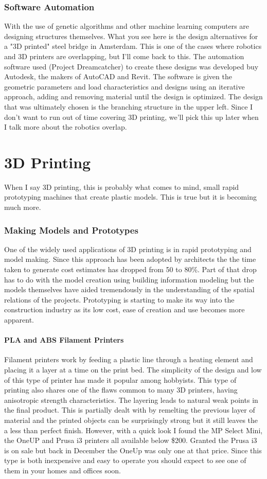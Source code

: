 \documentclass[11pt]{article}
\begin{document}
\subsubsection{Software Automation}
With the use of genetic algorithms and other machine learning computers are designing structures themselves.  What you see here is the design alternatives for a "3D printed" steel bridge in Amsterdam.  This is one of the cases where robotics and 3D printers are overlapping, but I'll come back to this.  The automation software used (Project Dreamcatcher) to create these designs was developed buy Autodesk, the makers of AutoCAD and Revit.  The software is given the geometric parameters and load characteristics and designs using an iterative approach, adding and removing material until the design is optimized.  The design that was ultimately chosen is the branching structure in the upper left.  Since I don't want to run out of time covering 3D printing, we'll pick this up later when I talk more about the robotics overlap.
\section{3D Printing}
When I say 3D printing, this is probably what comes to mind, small rapid prototyping machines that create plastic models. This is true but it is becoming much more.
\subsubsection{Making Models and Prototypes}
One of the widely used applications of 3D printing is in rapid prototyping and model making.  Since this approach has been adopted by architects the the time taken to generate cost estimates has dropped from 50 to 80\%.  Part of that drop has to do with the model creation using building information modeling but the models themselves have aided tremendously in the understanding of the spatial relations of the projects.  Prototyping is starting to make its way into the construction industry as its low cost, ease of creation and use becomes more apparent.
\paragraph{PLA and ABS Filament Printers}


Filament printers work by feeding a plastic line through a heating element and placing it a layer at a time on the print bed.  The simplicity of the design and low of this type of printer has made it popular among hobbyists.  This type of printing also shares one of the flaws common to many 3D printers, having anisotropic strength characteristics.  The layering leads to natural weak points in the final product.  This is partially dealt with by remelting the previous layer of material and the printed objects can be surprisingly strong but it still leaves the a less than perfect finish.  However, with a quick look I found the MP Select Mini, the OneUP and Prusa i3 printers all available below \$200.  Granted the Prusa i3 is on sale but back in December the OneUp was only one at that price.  Since this type is both inexpensive and easy to operate you should expect to see one of them in your homes and offices soon. 
\end{document}
